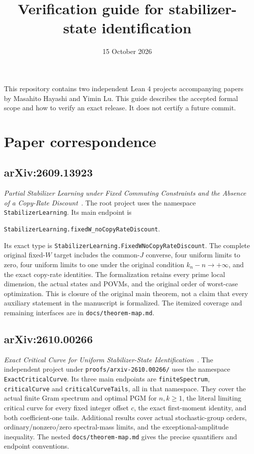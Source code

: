\documentclass[10pt]{amsart}
\title{Verification guide for stabilizer-state identification}
\date{15 October 2026}
\begin{document}
\maketitle
\noindent
This repository contains two independent Lean 4 projects accompanying papers
by Masahito Hayashi and Yimin Lu. This guide describes the accepted formal
scope and how to verify an exact release. It does not certify a future commit.

\section{Paper correspondence}
\subsection*{arXiv:2609.13923}
\emph{Partial Stabilizer Learning under Fixed Commuting Constraints and the
Absence of a Copy-Rate Discount}~\cite{partial}.
The root project uses the namespace \texttt{StabilizerLearning}.
Its main endpoint is
\begin{center}\small
\texttt{StabilizerLearning.fixedW\_noCopyRateDiscount}.
\end{center}
Its exact type is \texttt{StabilizerLearning.FixedWNoCopyRateDiscount}.
The complete original fixed-$W$ target includes the common-$J$ converse,
four uniform limits to zero, four uniform limits to one under the original
condition $k_n-n\to+\infty$, and the exact copy-rate identities.
The formalization retains every prime local dimension, the actual states
and POVMs, and the original order of worst-case optimization.
This is closure of the original main theorem, not a claim that every
auxiliary statement in the manuscript is formalized.
The itemized coverage and remaining interfaces are in
\texttt{docs/theorem-map.md}.

\subsection*{arXiv:2610.00266}
\emph{Exact Critical Curve for Uniform Stabilizer-State
Identification}~\cite{critical}.
The independent project under \texttt{proofs/arxiv-2610.00266/}
uses the namespace \texttt{ExactCriticalCurve}.
Its three main endpoints are
\texttt{finiteSpectrum}, \texttt{criticalCurve} and
\texttt{criticalCurveTails}, all in that namespace.
They cover the actual finite Gram spectrum and optimal PGM for $n,k\geq1$,
the literal limiting critical curve for every fixed integer offset $c$,
the exact first-moment identity, and both coefficient-one tails.
Additional results cover actual stochastic-group orders, ordinary/nonzero/zero
spectral-mass limits, and the exceptional-amplitude inequality.
The nested \texttt{docs/theorem-map.md} gives the precise quantifiers and
endpoint conventions.
\end{document}
